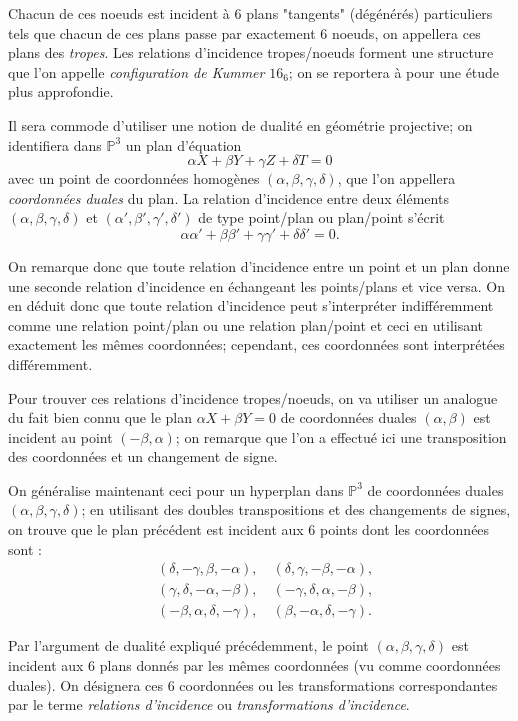 \documentclass[a4paper,12pt]{article}
\theoremstyle{definition}
\theoremstyle{remark}
\numberwithin{equation}{section}
\begin{document}
Chacun de ces noeuds est incident à 6 plans "tangents" (dégénérés) particuliers tels que chacun de ces plans passe par exactement 6 noeuds, on appellera ces plans des \emph{tropes}. Les relations d'incidence tropes/noeuds forment une structure que l'on appelle \emph{configuration de Kummer} $16_6$; on se reportera à \citep{hudson} pour une étude plus approfondie.

Il sera commode d'utiliser une notion de dualité en géométrie projective; on identifiera dans $\mathbb{P}^3$ un plan d'équation $$\alpha X + \beta Y + \gamma Z + \delta T = 0$$ avec un point de coordonnées homogènes $(\alpha, \beta, \gamma, \delta)$, que l'on appellera \emph{coordonnées duales} du plan. La relation d'incidence entre deux éléments $(\alpha, \beta, \gamma, \delta)$ et $(\alpha', \beta', \gamma', \delta')$ de type point/plan ou plan/point s'écrit
$$\alpha\alpha' + \beta\beta' + \gamma\gamma' + \delta\delta' = 0.$$

On remarque donc que toute relation d'incidence entre un point et un plan donne une seconde relation d'incidence en échangeant les points/plans et vice versa. On en déduit donc que toute relation d'incidence peut s'interpréter indifféremment comme une relation point/plan ou une relation plan/point et ceci en utilisant exactement les mêmes coordonnées; cependant, ces coordonnées sont interprétées différemment.

Pour trouver ces relations d'incidence tropes/noeuds, on va utiliser un analogue du fait bien connu que le plan $\alpha X + \beta Y=0$ de coordonnées duales $(\alpha,\beta)$ est incident au point $(-\beta, \alpha)$; on remarque que l'on a effectué ici une transposition des coordonnées et un changement de signe.

On généralise maintenant ceci pour un hyperplan dans $\mathbb{P}^3$ de coordonnées duales $(\alpha, \beta, \gamma, \delta)$; en utilisant des doubles transpositions et des changements de signes, on trouve que le plan précédent est incident aux 6 points dont les coordonnées sont :
\begin{align*}
   &(\delta, -\gamma, \beta, -\alpha), \quad (\delta, \gamma, -\beta, -\alpha), \\
   &(\gamma, \delta, -\alpha, -\beta), \quad (-\gamma, \delta, \alpha, -\beta), \\
   &(-\beta, \alpha, \delta, -\gamma), \quad (\beta, -\alpha, \delta, -\gamma).
\end{align*}

Par l'argument de dualité expliqué précédemment, le point $(\alpha, \beta, \gamma, \delta)$ est incident aux 6 plans donnés par les mêmes coordonnées (vu comme coordonnées duales).
On désignera ces 6 coordonnées ou les transformations correspondantes par le terme \emph{relations d'incidence} ou \emph{transformations d'incidence}.
\end{document}
